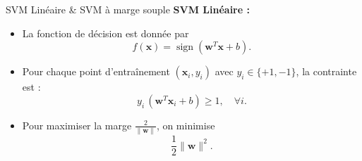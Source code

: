 \documentclass{beamer}
\begin{document}
\begin{frame}{SVM Linéaire \& SVM à marge souple}
    \textbf{SVM Linéaire :}
    \begin{itemize}
        \item La fonction de décision est donnée par
        \[
        f(\mathbf{x}) = \operatorname{sign}(\mathbf{w}^T\mathbf{x} + b).
        \]
        \item Pour chaque point d'entraînement \((\mathbf{x}_i, y_i)\) avec \(y_i \in \{+1, -1\}\), la contrainte est :
        \[
        y_i \, (\mathbf{w}^T\mathbf{x}_i + b) \ge 1,\quad \forall i.
        \]
        \item Pour maximiser la marge \( \frac{2}{\|\mathbf{w}\|} \), on minimise
        \[
        \frac{1}{2}\|\mathbf{w}\|^2.
        \]
    \end{itemize}
\end{frame}
\end{document}
